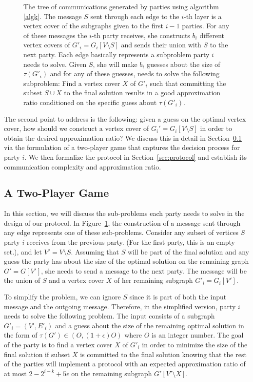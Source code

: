 \documentclass[11pt]{article}
\newcommand{\mvc}[1]{\tau\left(#1 \right)}
\begin{document}
\begin{figure}[h]
{\begin{tikzpicture}
\end{tikzpicture}

}

       \caption{\small The tree of communications generated by parties using algorithm \ref{algk}. The message $S$ sent through each edge to the $i$-th layer is a vertex cover of the subgraphs given to the first $i-1$ parties. For any of these messages the $i$-th party receives, she constructs $b_i$ different vertex covers of $G'_i=G_i[V\setminus S]$ and sends their union with $S$ to the next party. Each edge basically represents a subproblem party $i$ needs to solve. Given $S$, she will make $b_i$ guesses about the size of $\mvc{G'_i}$ and for any of these guesses, needs to solve the following subproblem: Find a vertex cover $X$ of $G'_i$ such that committing the subset $S\cup X$ to the final solution results in a good approximation ratio conditioned on the specific guess about $\mvc{G'_i}$. 
    }
    \label{fig:kparty}
\end{figure}
     The second point to address is the following: given a guess on the
optimal vertex cover, how should we construct a vertex cover of $G_i'
= G_i[V \setminus S]$ in order to obtain the desired approximation
ratio?  We discuss this in detail in Section~\ref{sec:ojirjgioer} via
the formulation of a two-player game that captures the decision
process for party $i$.  We then formalize the protocol in
Section~\ref{sec:protocol} and establish its communication complexity
and approximation ratio.



\subsection{A Two-Player Game}\label{sec:ojirjgioer}
In this section, we will discuss the sub-problems each party needs to solve in the design of our protocol. In Figure~\ref{fig:kparty}, the construction of a message sent through any edge represents one of these sub-problems. Consider any subset of vertices $S$ party $i$ receives from the previous party. (For the first party, this is an empty set.),  and let $V'= V\setminus S$. Assuming that $S$ will be part of the final solution and any guess the party has about the size of the optimal solution on the remaining graph $G'=G[V']$, she needs to send a message to the next party. The message will be the union of $S$ and a vertex cover $X$ of her remaining subgraph $G'_i=G_i[V']$. 

To simplify the problem, we can ignore $S$ since it is part of both the input message and the outgoing message. Therefore, in the simplified version, party $i$ needs to solve the following problem. The input consists of a subgraph  $G'_i = (V', E'_i)$ and a guess about the size of the remaining optimal solution in the form of $\mvc{G'}\in (O, (1+\epsilon)O)$  where $O$ is an integer number. The goal of the party is to find a vertex cover $X$ of  $G'_i$ in order to minimize the size of the final solution if subset $X$ is committed to the final solution knowing that the rest of the parties will implement a protocol with an expected approximation ratio of at most $2-2^{i-k}+5\epsilon$ on the remaining  subgraph $G'[V'\setminus X]$.
\end{document}
